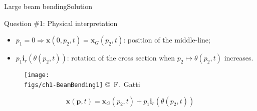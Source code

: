 \documentclass{beamer}
\newcommand{\imply}{\Rightarrow}
\newcommand{\xj}{x}
\newcommand{\xv}{{\boldsymbol\xj}}
\renewcommand{\ij}{i}
\newcommand{\pj}{p}
\newcommand{\iv}{{\boldsymbol\ij}}
\newcommand{\pv}{{\boldsymbol\pj}}
\begin{document}
\begin{frame}{Large beam bending}{Solution}

\begin{exampleblock}{Question \#1: Physical interpretation}
\begin{itemize}
\item $\pj_1=0\imply\xv(0,\pj_2,t)=\xv_G(\pj_2,t)$: position of the middle-line;
\item $\pj_1\iv_r(\theta(\pj_2,t))$: rotation of the cross section when $\pj_2\mapsto\theta(\pj_2,t)$ increases.
\end{itemize}
\vskip-10pt
\begin{figure}
\centering\texttt{[image: \\figs/ch1-BeamBending1]}
\vskip-5pt{\hspace{3truecm}\mbox{\tiny{\copyright\ F. Gatti}}}
\end{figure}
\vskip-10pt
\begin{displaymath}
\xv(\pv,t)=\xv_G(\pj_2,t)+\pj_1\iv_r(\theta(\pj_2,t))
\end{displaymath}
\end{exampleblock}

\end{frame}
\end{document}
